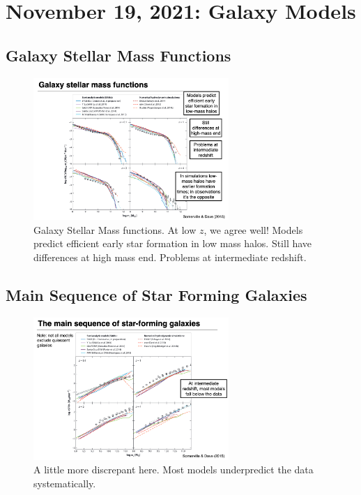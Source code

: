 \documentclass{article}
\begin{document}
\section{November 19, 2021: Galaxy Models}

\subsection{Galaxy Stellar Mass Functions}

\begin{figure}
    \centering
    \includegraphics[width=0.66\textwidth]{figs/Screen Shot 2021-11-19 at 10.30.33 AM.png}
    \caption{Galaxy Stellar Mass functions. At low $z$, we agree well! Models predict efficient early star formation in low mass halos. Still have differences at high mass end. Problems at intermediate redshift. }
    \label{fig:galaxy_stellar_mass_fx}
\end{figure}


\subsection{Main Sequence of Star Forming Galaxies}

\begin{figure}
    \centering
    \includegraphics[width=0.66\textwidth]{figs/Screen Shot 2021-11-19 at 10.33.21 AM.png}
    \caption{A little more discrepant here. Most models underpredict the data systematically. }
    \label{fig:ms_gaalx_pred}
\end{figure}
\end{document}
